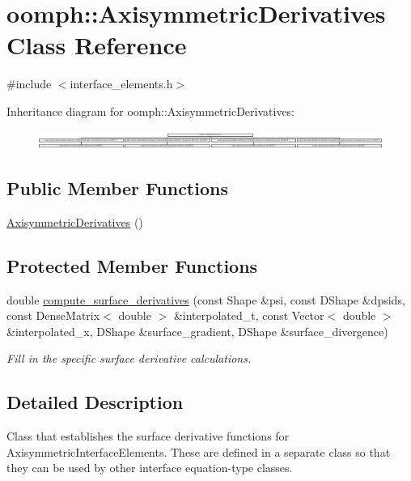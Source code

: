\hypertarget{classoomph_1_1AxisymmetricDerivatives}{}\section{oomph\+:\+:Axisymmetric\+Derivatives Class Reference}
\label{classoomph_1_1AxisymmetricDerivatives}


{\ttfamily \#include $<$interface\+\_\+elements.\+h$>$}

Inheritance diagram for oomph\+:\+:Axisymmetric\+Derivatives\+:\begin{figure}[H]
\begin{center}
\leavevmode
\includegraphics[height=0.595745cm]{classoomph_1_1AxisymmetricDerivatives}
\end{center}
\end{figure}
\subsection*{Public Member Functions}
\begin{DoxyCompactItemize}
\item 
\hyperlink{classoomph_1_1AxisymmetricDerivatives_a91b259ef45c7563b05bf79de4b0fe4bf}{Axisymmetric\+Derivatives} ()
\end{DoxyCompactItemize}
\subsection*{Protected Member Functions}
\begin{DoxyCompactItemize}
\item 
double \hyperlink{classoomph_1_1AxisymmetricDerivatives_a306ea6b57d09d57e87e8d74a13c2f828}{compute\+\_\+surface\+\_\+derivatives} (const Shape \&psi, const D\+Shape \&dpsids, const Dense\+Matrix$<$ double $>$ \&interpolated\+\_\+t, const Vector$<$ double $>$ \&interpolated\+\_\+x, D\+Shape \&surface\+\_\+gradient, D\+Shape \&surface\+\_\+divergence)
\begin{DoxyCompactList}\small\item\em Fill in the specific surface derivative calculations. \end{DoxyCompactList}\end{DoxyCompactItemize}


\subsection{Detailed Description}
Class that establishes the surface derivative functions for Axisymmetric\+Interface\+Elements. These are defined in a separate class so that they can be used by other interface equation-\/type classes. 

